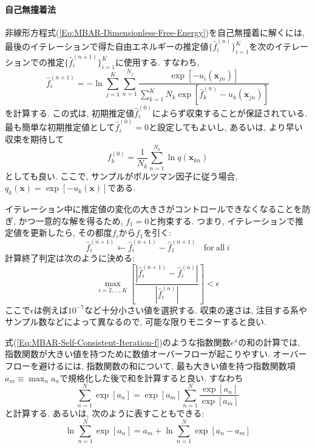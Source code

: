 \paragraph{自己無撞着法}
非線形方程式(\ref{Eq:MBAR-Dimensionless-Free-Energy})を自己無撞着に解くには, 最後のイテレーションで得た自由エネルギーの推定値$\{\hat{f}_{i}^{(n)}\}_{i=1}^{K}$を次のイテレーションでの推定$\{\hat{f}_{i}^{(n+1)}\}_{i=1}^{K}$に使用する. すなわち, 
\begin{equation}
    \hat{f}_{i}^{(n+1)}
    =
    -\ln
    \sum_{j=1}^{K} \sum_{n=1}^{N_{j}}
    \frac{
        \exp[-u_{i}(\bm{x}_{jn})]
    }{
        \sum_{k=1}^{K}
        N_{k}
        \exp[\hat{f}_{k}^{(n)} - u_{k}(\bm{x}_{jn})]
    }
\end{equation}
を計算する. 
この式は, 初期推定値$\hat{f}_{i}^(0)$によらず収束することが保証されている. 最も簡単な初期推定値として$\hat{f}_{i}^(0)=0$と設定してもよいし, あるいは, より早い収束を期待して
\begin{equation}
    f_{k}^{(0)}
    =
    \frac{1}{N_{k}}
    \sum_{n=1}^{N_{k}} \ln q(\bm{x}_{kn})
    \label{Eq:MBAR-Self-Consistent-Iteration-f}
\end{equation}
としても良い. ここで, サンプルがボルツマン因子に従う場合, $q_{k}(\bm{x}) = \exp[-u_{k}(\bm{x})]$である. 

イテレーション中に推定値の変化の大きさがコントロールできなくなることを防ぎ, かつ一意的な解を得るため, $f_{1} = 0$と拘束する. つまり, イテレーションで推定値を更新したら, その都度$f_{i}$から$f_{1}$を引く:
\begin{equation}
    \hat{f}_{i}^{(n+1)} \leftarrow \hat{f}_{i}^{(n+1)} - \hat{f}_{1}^{(n+1)}
    ~~~~\mathrm{for~all}~i
\end{equation}
計算終了判定は次のように決める:
\begin{equation}
    \max_{i=2,\ldots,K}
    \left[
        \frac{|\hat{f}_{i}^{(n+1)} - \hat{f}_{i}^{(n)}|}{|\hat{f}_{i}^{(n)}|}
    \right]
    <
    \epsilon
\end{equation}
ここで$\epsilon$は例えば$10^{-7}$など十分小さい値を選択する. 
収束の速さは, 注目する系やサンプル数などによって異なるので, 可能な限りモニターすると良い. 

式(\ref{Eq:MBAR-Self-Consistent-Iteration-f})のような指数関数$e^{a}$の和の計算では, 指数関数が大きい値を持つために数値オーバーフローが起こりやすい. 
オーバーフローを避けるには, 指数関数の和について, 最も大きい値を持つ指数関数項$a_{m} \equiv \max_{n} a_{n}$で規格化した後で和を計算すると良い. すなわち
\begin{equation}
    \sum_{n=1}^{N} \exp[a_{n}]
    =
    \exp[a_{m}]
    \sum_{n=1}^{N}
    \frac{\exp[a_{n}]}{\exp[a_{m}]}
\end{equation}
と計算する. あるいは, 次のように表すこともできる:
\begin{equation}
    \ln \sum_{n=1}^{N} \exp[a_{n}]
    =
    a_{m} + \ln \sum_{n=1}^{N} \exp[a_{n} - a_{m}]
\end{equation}

